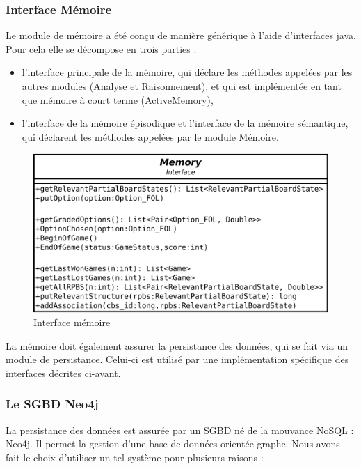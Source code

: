 \subsubsection{Interface Mémoire}

Le module de mémoire a été conçu de manière générique à l'aide d'interfaces java. Pour cela elle se décompose en trois parties :

\begin{itemize}
\item l'interface principale de la mémoire, qui déclare les méthodes appelées par les autres modules (Analyse et Raisonnement), et qui est implémentée en tant que mémoire à court terme (ActiveMemory),

\item l'interface de la mémoire épisodique et l'interface de la mémoire sémantique, qui déclarent les méthodes appelées par le module Mémoire.
\end{itemize}

\begin{figure}[H]
\includegraphics[width=\textwidth]{files/memoire/interface}
\caption{Interface mémoire}
\end{figure}

La mémoire doit également assurer la persistance des données, qui se fait via un module de persistance. Celui-ci est utilisé par une implémentation spécifique des interfaces décrites ci-avant.

\subsubsection{Le SGBD Neo4j}

La persistance des données est assurée par un SGBD né de la mouvance \gls{NoSQL} : Neo4j. Il permet la gestion d'une base de données orientée graphe. Nous avons fait le choix d'utiliser un tel système pour plusieurs raisons :


